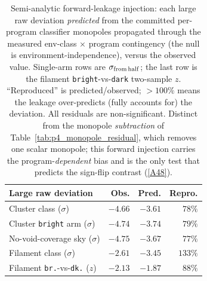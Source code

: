 \documentclass[twocolumn,linenumbers]{aastex702}
\newcommand{\repoBase}{https://github.com/Hubify-Projects/bigbounce/blob/main}
\begin{document}
\begin{table}[ht]
\caption{Semi-analytic forward-leakage injection: each large raw deviation
\emph{predicted} from the committed per-program classifier monopoles propagated
through the measured env-class $\times$ program contingency (the null is
environment-independence), versus the observed value. Single-arm rows are
$\sigma_{\rm from\,half}$; the last row is the filament \texttt{bright}-vs-\texttt{dark}
two-sample $z$. ``Reproduced'' is predicted/observed; $>100\%$ means the leakage
over-predicts (fully accounts for) the deviation. All residuals are
non-significant. Distinct from the monopole \emph{subtraction} of
Table~\ref{tab:p4_monopole_residual}, which removes one scalar monopole; this
forward injection carries the program-\emph{dependent} bias and is the only test
that predicts the sign-flip contrast (\href{\repoBase/pipelines/p5\_desi\_chirality/analysis/forward\_leakage\_injection\_v0\_1\_141.json}{[A48]}).}
\label{tab:forward_leakage}
\begin{ruledtabular}
\begin{tabular}{lrrr}
Large raw deviation & Obs. & Pred. & Repro. \\
\hline
Cluster class ($\sigma$) & $-4.66$ & $-3.61$ & $78\%$ \\
Cluster \texttt{bright} arm ($\sigma$) & $-4.74$ & $-3.74$ & $79\%$ \\
No-void-coverage sky ($\sigma$) & $-4.75$ & $-3.67$ & $77\%$ \\
Filament class ($\sigma$) & $-2.61$ & $-3.45$ & $133\%$ \\
Filament \texttt{br.}-vs-\texttt{dk.} ($z$) & $-2.13$ & $-1.87$ & $88\%$ \\
\end{tabular}
\end{ruledtabular}
\end{table}
\end{document}
